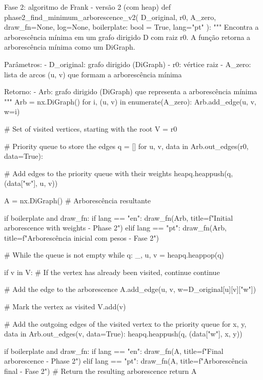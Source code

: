 \documentclass[12pt,a4paper]{article}
\begin{document}
\begin{pybox}{Fase 2: algoritmo de Frank - versão 2 (com heap)}
def phase2_find_minimum_arborescence_v2(
    D_original, r0, A_zero, draw_fn=None, log=None, boilerplate: bool = True, lang="pt"
):
    """
    Encontra a arborescência mínima em um grafo dirigido D com raiz r0.
    A função retorna a arborescência mínima como um DiGraph.

    Parâmetros:
        - D_original: grafo dirigido (DiGraph)
        - r0: vértice raiz
        - A_zero: lista de arcos (u, v) que formam a arborescência mínima

    Retorno:
        - Arb: grafo dirigido (DiGraph) que representa a arborescência mínima
    """
    Arb = nx.DiGraph()
    for i, (u, v) in enumerate(A_zero):
        Arb.add_edge(u, v, w=i)

    # Set of visited vertices, starting with the root
    V = {r0}

    # Priority queue to store the edges
    q = []
    for u, v, data in Arb.out_edges(r0, data=True):

        # Add edges to the priority queue with their weights
        heapq.heappush(q, (data["w"], u, v))

    A = nx.DiGraph()  # Arborescência resultante

    if boilerplate and draw_fn:
        if lang == "en":
            draw_fn(Arb, title=f"Initial arborescence with weights - Phase 2")
        elif lang == "pt":
            draw_fn(Arb, title=f"Arborescência inicial com pesos - Fase 2")

    # While the queue is not empty
    while q:
        _, u, v = heapq.heappop(q)

        if v in V:  # If the vertex has already been visited, continue
            continue

        # Add the edge to the arborescence
        A.add_edge(u, v, w=D_original[u][v]["w"])

        # Mark the vertex as visited
        V.add(v)

        # Add the outgoing edges of the visited vertex to the priority queue
        for x, y, data in Arb.out_edges(v, data=True):
            heapq.heappush(q, (data["w"], x, y))

    if boilerplate and draw_fn:
        if lang == "en":
            draw_fn(A, title=f"Final arborescence - Phase 2")
        elif lang == "pt":
            draw_fn(A, title=f"Arborescência final - Fase 2")
    # Return the resulting arborescence
    return A
\end{pybox}
\end{document}
